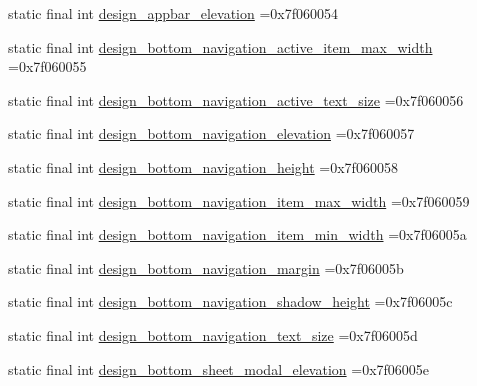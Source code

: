 \begin{DoxyCompactItemize}
\item 
static final int \mbox{\hyperlink{classcom_1_1example_1_1trainawearapplication_1_1_r_1_1dimen_af8851c288c4de923b9b3160f289728da}{design\+\_\+appbar\+\_\+elevation}} =0x7f060054
\item 
static final int \mbox{\hyperlink{classcom_1_1example_1_1trainawearapplication_1_1_r_1_1dimen_ab4739bb70b0bfa7f0e31fec9c177405e}{design\+\_\+bottom\+\_\+navigation\+\_\+active\+\_\+item\+\_\+max\+\_\+width}} =0x7f060055
\item 
static final int \mbox{\hyperlink{classcom_1_1example_1_1trainawearapplication_1_1_r_1_1dimen_a54517e2f42c8fc2dac7a0b4656ce8c24}{design\+\_\+bottom\+\_\+navigation\+\_\+active\+\_\+text\+\_\+size}} =0x7f060056
\item 
static final int \mbox{\hyperlink{classcom_1_1example_1_1trainawearapplication_1_1_r_1_1dimen_a2ca9520411112bb62b65c555d14a306e}{design\+\_\+bottom\+\_\+navigation\+\_\+elevation}} =0x7f060057
\item 
static final int \mbox{\hyperlink{classcom_1_1example_1_1trainawearapplication_1_1_r_1_1dimen_a5b0eed820c3811d8e9dfc05bbcdeea0a}{design\+\_\+bottom\+\_\+navigation\+\_\+height}} =0x7f060058
\item 
static final int \mbox{\hyperlink{classcom_1_1example_1_1trainawearapplication_1_1_r_1_1dimen_aac06e3f7882c3b45dc428de88d26eec3}{design\+\_\+bottom\+\_\+navigation\+\_\+item\+\_\+max\+\_\+width}} =0x7f060059
\item 
static final int \mbox{\hyperlink{classcom_1_1example_1_1trainawearapplication_1_1_r_1_1dimen_a43afbe2da55e191e2db922044374cb28}{design\+\_\+bottom\+\_\+navigation\+\_\+item\+\_\+min\+\_\+width}} =0x7f06005a
\item 
static final int \mbox{\hyperlink{classcom_1_1example_1_1trainawearapplication_1_1_r_1_1dimen_a14b2331f48c1f0ce4c4b5c65c022a0be}{design\+\_\+bottom\+\_\+navigation\+\_\+margin}} =0x7f06005b
\item 
static final int \mbox{\hyperlink{classcom_1_1example_1_1trainawearapplication_1_1_r_1_1dimen_aa8384586fb43be50b197debde89c0638}{design\+\_\+bottom\+\_\+navigation\+\_\+shadow\+\_\+height}} =0x7f06005c
\item 
static final int \mbox{\hyperlink{classcom_1_1example_1_1trainawearapplication_1_1_r_1_1dimen_a595240e0f409144486027992348e089f}{design\+\_\+bottom\+\_\+navigation\+\_\+text\+\_\+size}} =0x7f06005d
\item 
static final int \mbox{\hyperlink{classcom_1_1example_1_1trainawearapplication_1_1_r_1_1dimen_a92cc93770c187893428a2523bbc7b414}{design\+\_\+bottom\+\_\+sheet\+\_\+modal\+\_\+elevation}} =0x7f06005e

\end{DoxyCompactItemize}
